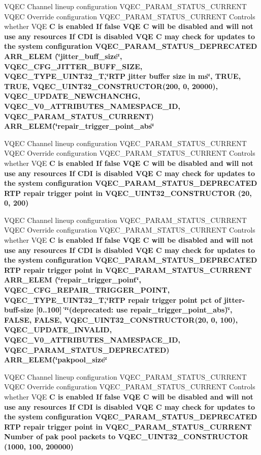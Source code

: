 \begin{CompactItemize}
\item 
VQEC Channel lineup configuration VQEC\_\-PARAM\_\-STATUS\_\-CURRENT VQEC Override configuration VQEC\_\-PARAM\_\-STATUS\_\-CURRENT Controls whether VQE \bf{C} is enabled If false VQE \bf{C} will be disabled and will not use any resources If CDI is disabled VQE \bf{C} may check for updates \bf{to} the system configuration VQEC\_\-PARAM\_\-STATUS\_\-DEPRECATED \bf{ARR\_\-ELEM} (\char`\"{}jitter\_\-buff\_\-size\char`\"{}, VQEC\_\-CFG\_\-JITTER\_\-BUFF\_\-SIZE, \bf{VQEC\_\-TYPE\_\-UINT32\_\-T},\char`\"{}RTP jitter buffer size in \bf{ms}\char`\"{}, TRUE, \bf{TRUE}, VQEC\_\-UINT32\_\-CONSTRUCTOR(200, 0, 20000), \bf{VQEC\_\-UPDATE\_\-NEWCHANCHG}, \bf{VQEC\_\-V0\_\-ATTRIBUTES\_\-NAMESPACE\_\-ID}, VQEC\_\-PARAM\_\-STATUS\_\-CURRENT) ARR\_\-ELEM(\char`\"{}repair\_\-trigger\_\-point\_\-abs\char`\"{}
\item 
VQEC Channel lineup configuration VQEC\_\-PARAM\_\-STATUS\_\-CURRENT VQEC Override configuration VQEC\_\-PARAM\_\-STATUS\_\-CURRENT Controls whether VQE \bf{C} is enabled If false VQE \bf{C} will be disabled and will not use any resources If CDI is disabled VQE \bf{C} may check for updates \bf{to} the system configuration VQEC\_\-PARAM\_\-STATUS\_\-DEPRECATED RTP repair trigger point in \bf{VQEC\_\-UINT32\_\-CONSTRUCTOR} (20, 0, 200)
\item 
VQEC Channel lineup configuration VQEC\_\-PARAM\_\-STATUS\_\-CURRENT VQEC Override configuration VQEC\_\-PARAM\_\-STATUS\_\-CURRENT Controls whether VQE \bf{C} is enabled If false VQE \bf{C} will be disabled and will not use any resources If CDI is disabled VQE \bf{C} may check for updates \bf{to} the system configuration VQEC\_\-PARAM\_\-STATUS\_\-DEPRECATED RTP repair trigger point in VQEC\_\-PARAM\_\-STATUS\_\-CURRENT \bf{ARR\_\-ELEM} (\char`\"{}repair\_\-trigger\_\-point\char`\"{}, VQEC\_\-CFG\_\-REPAIR\_\-TRIGGER\_\-POINT, \bf{VQEC\_\-TYPE\_\-UINT32\_\-T},\char`\"{}RTP repair trigger point pct of jitter-buff-size [0..100] \char`\"{}\char`\"{}(deprecated: use repair\_\-trigger\_\-point\_\-abs)\char`\"{}, FALSE, \bf{FALSE}, VQEC\_\-UINT32\_\-CONSTRUCTOR(20, 0, 100), \bf{VQEC\_\-UPDATE\_\-INVALID}, \bf{VQEC\_\-V0\_\-ATTRIBUTES\_\-NAMESPACE\_\-ID}, VQEC\_\-PARAM\_\-STATUS\_\-DEPRECATED) ARR\_\-ELEM(\char`\"{}pakpool\_\-size\char`\"{}
\item 
VQEC Channel lineup configuration VQEC\_\-PARAM\_\-STATUS\_\-CURRENT VQEC Override configuration VQEC\_\-PARAM\_\-STATUS\_\-CURRENT Controls whether VQE \bf{C} is enabled If false VQE \bf{C} will be disabled and will not use any resources If CDI is disabled VQE \bf{C} may check for updates \bf{to} the system configuration VQEC\_\-PARAM\_\-STATUS\_\-DEPRECATED RTP repair trigger point in VQEC\_\-PARAM\_\-STATUS\_\-CURRENT Number of pak pool packets \bf{to} \bf{VQEC\_\-UINT32\_\-CONSTRUCTOR} (1000, 100, 200000)

\end{CompactItemize}

